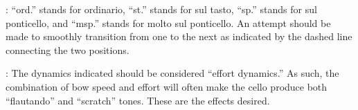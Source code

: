 \documentclass[10pt]{article}
\begin{document}
\vspace*{0.5\baselineskip}

\begingroup
\begin{center}
: ``ord.'' stands for ordinario, ``st.'' stands for sul tasto, ``sp.'' stands for sul ponticello, and ``msp.'' stands for molto sul ponticello. An attempt should be made to smoothly transition from one to the next as indicated by the dashed line connecting the two positions.
\rightskip\leftskip
\phantom{text} \hfill \phantom{()}
\end{center}
\endgroup

\vspace*{0.5\baselineskip}

\begingroup
\begin{center}
: The dynamics indicated should be considered ``effort dynamics.'' As such, the combination of bow speed and effort will often make the cello produce both ``flautando'' and ``scratch'' tones. These are the effects desired.
\rightskip\leftskip
\phantom{text} \hfill \phantom{()}
\end{center}
\endgroup

\vspace*{0.5\baselineskip}
\end{document}
